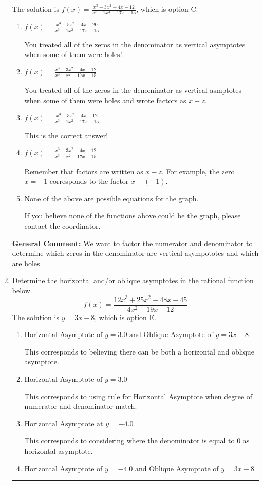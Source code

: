 \documentclass{extbook}[14pt]
\newcommand{\litem}[1]{\item #1

\rule{\textwidth}{0.4pt}}
\begin{document}
\begin{enumerate}
{The solution is \( f(x)=\frac{x^{3} +3 x^{2} -4 x -12}{x^{3} -1 x^{2} -17 x -15} \), which is option C.\begin{enumerate}[label=\Alph*.]
\item \( f(x)=\frac{x^{3} +5 x^{2} -4 x -20}{x^{3} -1 x^{2} -17 x -15} \)

You treated all of the zeros in the denominator as vertical asymptotes when some of them were holes!
\item \( f(x)=\frac{x^{3} -3 x^{2} -4 x + 12}{x^{3} + x^{2} -17 x + 15} \)

You treated all of the zeros in the denominator as vertical asmptotes when some of them were holes and wrote factors as $x+z$.
\item \( f(x)=\frac{x^{3} +3 x^{2} -4 x -12}{x^{3} -1 x^{2} -17 x -15} \)

This is the correct answer!
\item \( f(x)=\frac{x^{3} -3 x^{2} -4 x + 12}{x^{3} + x^{2} -17 x + 15} \)

Remember that factors are written as $x-z$. For example, the zero $x=-1$ corresponds to the factor $x-(-1)$.
\item \( \text{None of the above are possible equations for the graph.} \)

If you believe none of the functions above could be the graph, please contact the coordinator.
\end{enumerate}

\textbf{General Comment:} We want to factor the numerator and denominator to determine which zeros in the denominator are vertical asympototes and which are holes.
}
\litem{
Determine the horizontal and/or oblique asymptotes in the rational function below.
\[ f(x) = \frac{12x^{3} +25 x^{2} -48 x -45}{4x^{2} +19 x + 12} \]The solution is \( y = 3x -8 \), which is option E.\begin{enumerate}[label=\Alph*.]
\item \( \text{Horizontal Asymptote of } y = 3.0 \text{ and Oblique Asymptote of } y = 3x -8 \)

This corresponds to believing there can be both a horizontal and oblique asymptote.
\item \( \text{Horizontal Asymptote of } y = 3.0  \)

This corresponds to using rule for Horizontal Asymptote when degree of numerator and denominator match.
\item \( \text{Horizontal Asymptote at } y = -4.0 \)

This corresponds to considering where the denominator is equal to 0 as horizontal asymptote.
\item \( \text{Horizontal Asymptote of } y = -4.0 \text{ and Oblique Asymptote of } y = 3x -8 \)


\end{enumerate}}
\end{enumerate}
\end{document}
